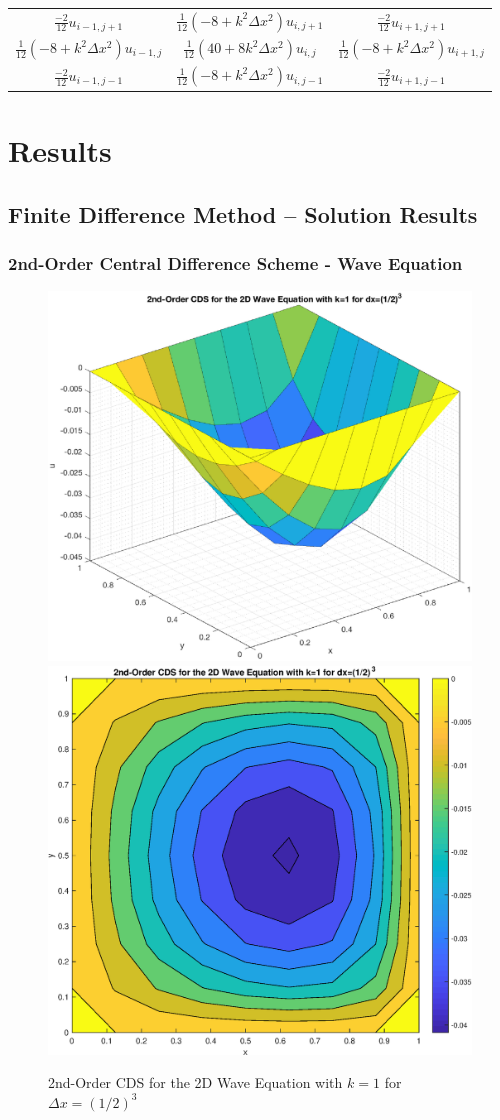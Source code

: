 \documentclass[10pt]{article}		%
\numberwithin{equation}{section}
\begin{document}
\begin{table}[H]
	\begin{tabular}{ccc}
		$\tfrac{-2}{12}u_{i-1, j+1}$ & $\tfrac{1}{12}(-8+k^2\Delta x^2)u_{i, j+1}$ & $\tfrac{-2}{12}u_{i+1, j+1}$  \\
		$\tfrac{1}{12}(-8+k^2\Delta x^2)u_{i-1, j}$ & $\tfrac{1}{12}(40+8k^2\Delta x^2)u_{i, j}$ & $\tfrac{1}{12}(-8+k^2\Delta x^2)u_{i+1, j}$ \\
		$\tfrac{-2}{12}u_{i-1, j-1}$ & $\tfrac{1}{12}(-8+k^2\Delta x^2)u_{i, j-1}$ & $\tfrac{-2}{12}u_{i+1, j-1}$
	\end{tabular}
\end{table}

\section{Results}

\subsection{Finite Difference Method -- Solution Results}

\subsubsection{2nd-Order Central Difference Scheme - Wave Equation}

\begin{figure}[H]
	\begin{center}
		\includegraphics[width = 0.32\linewidth]{surface_plus_order_2_k_1_dx_order_3}
		\includegraphics[width = 0.32\linewidth]{contour_plus_order_2_k_1_dx_order_3}
		\caption{2nd-Order CDS for the 2D Wave Equation with $k = 1$ for $\Delta x = (1/2)^3$}
	\end{center}
\end{figure}
\end{document}
